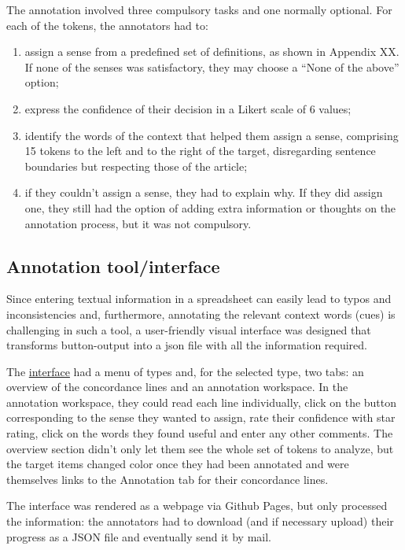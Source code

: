 \documentclass[
]{book}
\providecommand{\tightlist}{%
  \setlength{\itemsep}{0pt}\setlength{\parskip}{0pt}}
\begin{document}
The annotation involved three compulsory tasks and one normally optional. For each of the tokens, the annotators had to:

\begin{enumerate}
\def\labelenumi{\arabic{enumi}.}
\tightlist
\item
  assign a sense from a predefined set of definitions, as shown in Appendix XX. If none of the senses was satisfactory, they may choose a ``None of the above'' option;
\item
  express the confidence of their decision in a Likert scale of 6 values;
\item
  identify the words of the context that helped them assign a sense, comprising 15 tokens to the left and to the right of the target, disregarding sentence boundaries but respecting those of the article;
\item
  if they couldn't assign a sense, they had to explain why. If they did assign one, they still had the option of adding extra information or thoughts on the annotation process, but it was not compulsory.
\end{enumerate}

\hypertarget{annotation-toolinterface}{%
\subsection{Annotation tool/interface}\label{annotation-toolinterface}}

Since entering textual information in a spreadsheet can easily lead to typos and inconsistencies and, furthermore, annotating the relevant context words (cues) is challenging in such a tool, a user-friendly visual interface was designed that transforms button-output into a json file with all the information required.

The \href{http://montesmariana.github.io/Annotation/}{interface} had a menu of types and, for the selected type, two tabs: an overview of the concordance lines and an annotation workspace. In the annotation workspace, they could read each line individually, click on the button corresponding to the sense they wanted to assign, rate their confidence with star rating, click on the words they found useful and enter any other comments. The overview section didn't only let them see the whole set of tokens to analyze, but the target items changed color once they had been annotated and were themselves links to the Annotation tab for their concordance lines.

The interface was rendered as a webpage via Github Pages, but only processed the information: the annotators had to download (and if necessary upload) their progress as a JSON file and eventually send it by mail.
\end{document}
